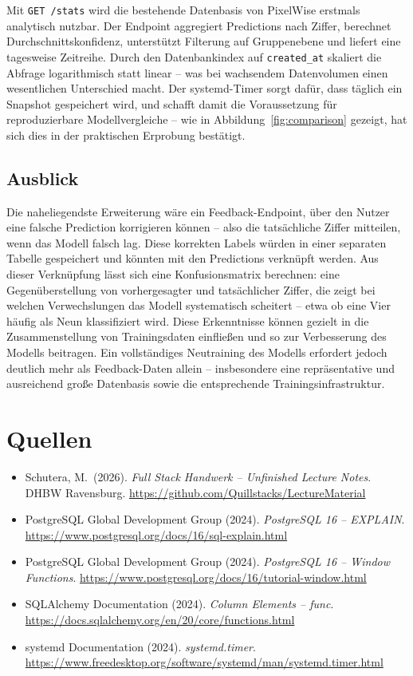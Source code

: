 \documentclass[12pt, a4paper]{article}
\begin{document}
Mit \texttt{GET /stats} wird die bestehende Datenbasis von PixelWise
erstmals analytisch nutzbar. Der Endpoint aggregiert Predictions nach
Ziffer, berechnet Durchschnittskonfidenz, unterstützt Filterung auf
Gruppenebene und liefert eine tagesweise Zeitreihe. Durch den
Datenbankindex auf \texttt{created\_at} skaliert die Abfrage logarithmisch
statt linear -- was bei wachsendem Datenvolumen einen wesentlichen
Unterschied macht. Der systemd-Timer sorgt dafür, dass täglich ein
Snapshot gespeichert wird, und schafft damit die Voraussetzung für
reproduzierbare Modellvergleiche -- wie in Abbildung~\ref{fig:comparison}
gezeigt, hat sich dies in der praktischen Erprobung bestätigt.

\subsection{Ausblick}

Die naheliegendste Erweiterung wäre ein Feedback-Endpoint, über den
Nutzer eine falsche Prediction korrigieren können -- also die tatsächliche
Ziffer mitteilen, wenn das Modell falsch lag. Diese korrekten Labels
würden in einer separaten Tabelle gespeichert und könnten mit den
Predictions verknüpft werden. Aus dieser Verknüpfung lässt sich eine
Konfusionsmatrix berechnen: eine Gegenüberstellung von vorhergesagter
und tatsächlicher Ziffer, die zeigt bei welchen Verwechslungen das Modell
systematisch scheitert -- etwa ob eine Vier häufig als Neun klassifiziert
wird. Diese Erkenntnisse können gezielt in die Zusammenstellung von
Trainingsdaten einfließen und so zur Verbesserung des Modells beitragen.
Ein vollständiges Neutraining des Modells erfordert jedoch deutlich mehr
als Feedback-Daten allein -- insbesondere eine repräsentative und
ausreichend große Datenbasis sowie die entsprechende Trainingsinfrastruktur.

\section*{Quellen}

\begin{itemize}[noitemsep]
  \item Schutera, M.\ (2026). \textit{Full Stack Handwerk -- Unfinished
        Lecture Notes}. DHBW Ravensburg.
        \url{https://github.com/Quillstacks/LectureMaterial}
  \item PostgreSQL Global Development Group (2024). \textit{PostgreSQL 16
        -- EXPLAIN}. \url{https://www.postgresql.org/docs/16/sql-explain.html}
  \item PostgreSQL Global Development Group (2024). \textit{PostgreSQL 16
        -- Window Functions}.
        \url{https://www.postgresql.org/docs/16/tutorial-window.html}
  \item SQLAlchemy Documentation (2024). \textit{Column Elements -- func}.
        \url{https://docs.sqlalchemy.org/en/20/core/functions.html}
  \item systemd Documentation (2024). \textit{systemd.timer}.
        \url{https://www.freedesktop.org/software/systemd/man/systemd.timer.html}
\end{itemize}
\end{document}

